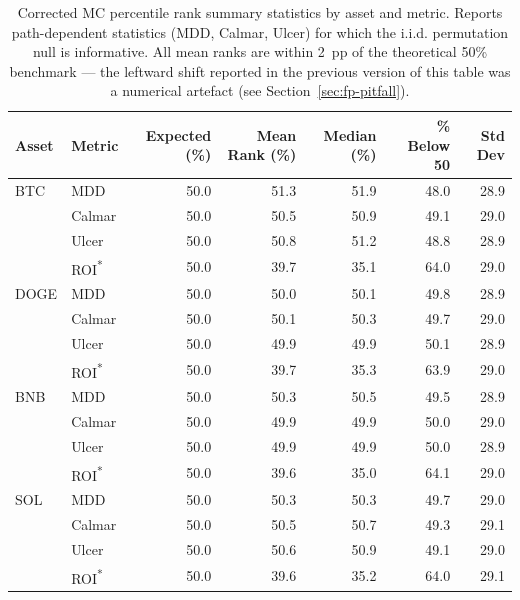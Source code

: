 \begin{table}[ht]
\centering
\small
\caption{Corrected MC percentile rank summary statistics by asset and metric. Reports path-dependent statistics (MDD, Calmar, Ulcer) for which the i.i.d. permutation null is informative. All mean ranks are within 2~pp of the theoretical 50\% benchmark — the leftward shift reported in the previous version of this table was a numerical artefact (see Section~\ref{sec:fp-pitfall}).}
\label{tab:mc_rank_summary_corrected}
\begin{tabular}{llrrrrr}
\toprule
Asset & Metric & Expected (\%) & Mean Rank (\%) & Median (\%) & \% Below 50 & Std Dev \\
\midrule
BTC & MDD & 50.0 & 51.3 & 51.9 & 48.0 & 28.9 \\
 & Calmar & 50.0 & 50.5 & 50.9 & 49.1 & 29.0 \\
 & Ulcer & 50.0 & 50.8 & 51.2 & 48.8 & 28.9 \\
 & ROI\textsuperscript{*} & 50.0 & 39.7 & 35.1 & 64.0 & 29.0 \\
\midrule
DOGE & MDD & 50.0 & 50.0 & 50.1 & 49.8 & 28.9 \\
 & Calmar & 50.0 & 50.1 & 50.3 & 49.7 & 29.0 \\
 & Ulcer & 50.0 & 49.9 & 49.9 & 50.1 & 28.9 \\
 & ROI\textsuperscript{*} & 50.0 & 39.7 & 35.3 & 63.9 & 29.0 \\
\midrule
BNB & MDD & 50.0 & 50.3 & 50.5 & 49.5 & 28.9 \\
 & Calmar & 50.0 & 49.9 & 49.9 & 50.0 & 29.0 \\
 & Ulcer & 50.0 & 49.9 & 49.9 & 50.0 & 28.9 \\
 & ROI\textsuperscript{*} & 50.0 & 39.6 & 35.0 & 64.1 & 29.0 \\
\midrule
SOL & MDD & 50.0 & 50.3 & 50.3 & 49.7 & 29.0 \\
 & Calmar & 50.0 & 50.5 & 50.7 & 49.3 & 29.1 \\
 & Ulcer & 50.0 & 50.6 & 50.9 & 49.1 & 29.0 \\
 & ROI\textsuperscript{*} & 50.0 & 39.6 & 35.2 & 64.0 & 29.1 \\

\end{tabular}
\end{table}
